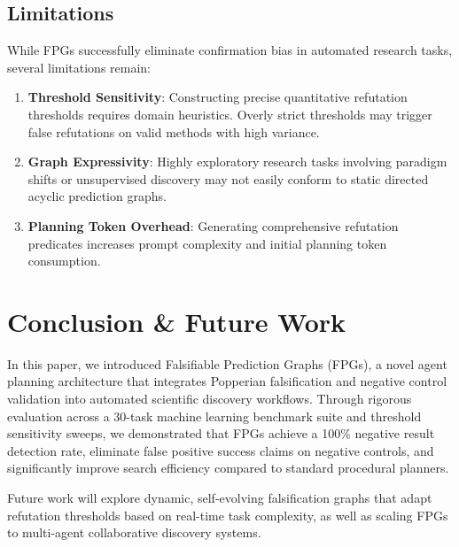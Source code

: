 \documentclass[11pt,letterpaper]{article}
\begin{document}
\subsection{Limitations}
While FPGs successfully eliminate confirmation bias in automated research tasks, several limitations remain:
\begin{enumerate}
    \item \textbf{Threshold Sensitivity}: Constructing precise quantitative refutation thresholds requires domain heuristics. Overly strict thresholds may trigger false refutations on valid methods with high variance.
    \item \textbf{Graph Expressivity}: Highly exploratory research tasks involving paradigm shifts or unsupervised discovery may not easily conform to static directed acyclic prediction graphs.
    \item \textbf{Planning Token Overhead}: Generating comprehensive refutation predicates increases prompt complexity and initial planning token consumption.
\end{enumerate}

\section{Conclusion \& Future Work}

In this paper, we introduced Falsifiable Prediction Graphs (FPGs), a novel agent planning architecture that integrates Popperian falsification and negative control validation into automated scientific discovery workflows. Through rigorous evaluation across a 30-task machine learning benchmark suite and threshold sensitivity sweeps, we demonstrated that FPGs achieve a 100\% negative result detection rate, eliminate false positive success claims on negative controls, and significantly improve search efficiency compared to standard procedural planners.

Future work will explore dynamic, self-evolving falsification graphs that adapt refutation thresholds based on real-time task complexity, as well as scaling FPGs to multi-agent collaborative discovery systems.



\end{document}
